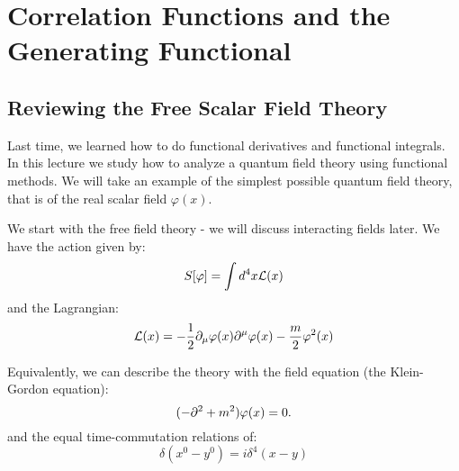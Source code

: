 \section{Correlation Functions and the Generating Functional}

\subsection{Reviewing the Free Scalar Field Theory}

Last time, we learned how to do functional derivatives and functional integrals. In this lecture we study how to analyze a quantum field theory using functional methods. We will take an example of the simplest possible quantum field theory, that is of the real scalar field $\varphi(x)$. 

We start with the free field theory - we will discuss interacting fields later. We have the action given by:
\begin{equation}
    S[\varphi] = \int d^4x \L(x)
\end{equation}
and the Lagrangian:
\begin{equation}
    \L(x) = -\frac{1}{2}\p_\mu \varphi(x) \p^\mu\varphi(x) - \frac{m}{2}\varphi^2(x)
\end{equation}

Equivalently, we can describe the theory with the field equation (the Klein-Gordon equation):
\begin{equation}
    (-\p^2 + m^2)\varphi(x) = 0.
\end{equation}
and the equal time-commutation relations of:
\begin{equation}
    [\varphi(x), \dpd{}{y^0}\varphi(y)]\delta(x^0 - y^0) = i\delta^4(x - y)
\end{equation}

